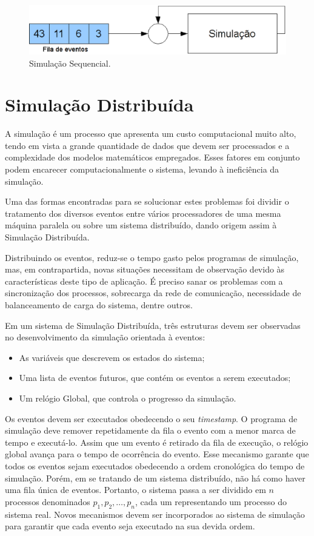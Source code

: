 \begin{figure}
  \centerline{\includegraphics[scale=0.6]{simulacao.eps}}
  \caption{Simulação Sequencial.}
\label{fig:simul}
\end{figure}

\section{Simulação Distribuída}
A simulação é um processo que apresenta um custo computacional muito alto, tendo em vista a grande quantidade de dados que devem ser processados e a complexidade dos modelos matemáticos empregados. Esses fatores em conjunto podem encarecer computacionalmente o sistema, levando à ineficiência da simulação.

Uma das formas encontradas para se solucionar estes problemas foi dividir o tratamento dos diversos eventos entre vários processadores de uma mesma máquina paralela ou sobre um sistema distribuído, dando origem assim à Simulação Distribuída.

Distribuindo os eventos, reduz-se o tempo gasto pelos programas de simulação, mas, em contrapartida, novas situações necessitam de observação devido às características deste tipo de aplicação. É preciso sanar os problemas com a sincronização dos processos, sobrecarga da rede de comunicação, necessidade de balanceamento de carga do sistema, dentre outros.

Em um sistema de Simulação Distribuída, três estruturas devem ser observadas no desenvolvimento da simulação orientada à eventos:

\begin{itemize}
    \item As variáveis que descrevem os estados do sistema;
    \item Uma lista de eventos futuros, que contém os eventos a serem executados;
    \item Um relógio Global, que controla o progresso da simulação.
\end{itemize}

Os eventos devem ser executados obedecendo o seu \textit{timestamp}. O programa de simulação deve remover repetidamente da fila o evento com a menor marca de tempo e executá-lo. Assim que um evento é retirado da fila de execução, o relógio global avança para o tempo de ocorrência do evento. Esse mecanismo garante que todos os eventos sejam executados obedecendo a ordem cronológica do tempo de simulação. Porém, em se tratando de um sistema distribuído, não há como haver uma fila única de eventos. Portanto, o sistema passa a ser dividido em $n$ processos denominados $p_{1}, p_{2},\ldots, p_{n}$, cada um representando um processo do sistema real. Novos mecanismos devem ser incorporados ao sistema de simulação para garantir que cada evento seja executado na sua devida ordem.

